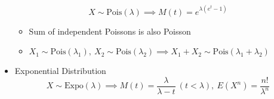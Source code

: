 \begin{itemize}
\begin{equation}
        X\sim\text{Pois}(\lambda)\implies M(t)=e^{\lambda(e^t-1)}
    \end{equation}
    \begin{itemize}
        \item Sum of independent Poissons is also Poisson
        \item $X_1\sim\text{Pois}(\lambda_1),~X_2\sim\text{Pois}(\lambda_2)\implies X_1+X_2\sim\text{Pois}(\lambda_1+\lambda_2)$
    \end{itemize}
    \item Exponential Distribution
    \begin{equation}
        X\sim\text{Expo}(\lambda)\implies M(t)=\frac{\lambda}{\lambda-t}~(t<\lambda),~E(X^n)=\frac{n!}{\lambda^n}
    \end{equation}
\end{itemize}
